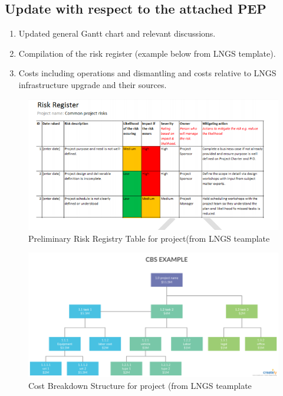 \subsection{Update with respect to the attached PEP}


\begin{enumerate}
\item Updated general Gantt chart and relevant discussions.
\item Compilation of the risk register (example below from LNGS template).
\item Costs including operations and dismantling and costs relative to  LNGS infrastructure upgrade and their sources.
\end{enumerate}




\begin{figure}
\begin{center}
\includegraphics[width=\textwidth]{./Figures/RiskRegisterLNGSTemplate}
\caption{Preliminary Risk Registry Table for \DSk project(from LNGS teamplate}
\label{fig:RiskRegistry}
\end{center}
\end{figure}

\begin{figure}
\begin{center}
\includegraphics[width=\textwidth]{./Figures/CostBreakdownStructureLNGSTemplate.png}
\caption{Cost Breakdown Structure for \DSk project (from LNGS teamplate}
\label{fig:CostBreakdownStructure}
\end{center}
\end{figure}
